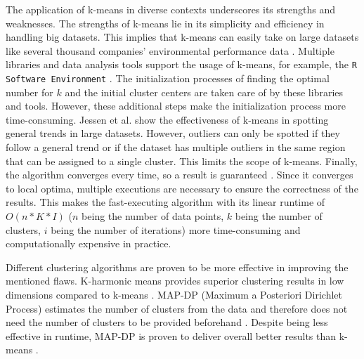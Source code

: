 The application of k-means in diverse contexts underscores its strengths and weaknesses.
The strengths of k-means lie in its simplicity and efficiency in handling big datasets.
This implies that k-means can easily take on large datasets like several thousand companies' environmental performance data \cite{LIU-BDE}.
Multiple libraries and data analysis tools support the usage of k-means, for example, the \texttt{R Software Environment} \cite{R-SOF}.
The initialization processes of finding the optimal number for $k$ and the initial cluster centers are taken care of by these libraries and tools.
However, these additional steps make the initialization process more time-consuming.
Jessen et al. \cite{JES-IND} show the effectiveness of k-means in spotting general trends in large datasets.
However, outliers can only be spotted if they follow a general trend or if the dataset has multiple outliers in the same region that can be assigned to a single cluster.
This limits the scope of k-means.
Finally, the algorithm converges every time, so a result is guaranteed \cite{SEL-GCT}.
Since it converges to local optima, multiple executions are necessary to ensure the correctness of the results.
This makes the fast-executing algorithm with its linear runtime of $O(n * K * I)$ ($n$ being the number of data points, $k$ being the number of clusters, $i$ being the number of iterations) more time-consuming and computationally expensive in practice.

Different clustering algorithms are proven to be more effective in improving the mentioned flaws.
K-harmonic means provides superior clustering results in low dimensions compared to k-means \cite{HAM-ALT}.
MAP-DP (Maximum a Posteriori Dirichlet Process) estimates the number of clusters from the data and therefore does not need the number of clusters to be provided beforehand \cite{RAY-ALT}.
Despite being less effective in runtime, MAP-DP is proven to deliver overall better results than k-means \cite{RAY-ALT}.


